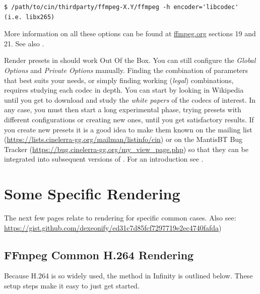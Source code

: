 \begin{lstlisting}[style=sh]
	$ /path/to/cin/thirdparty/ffmpeg-X.Y/ffmpeg -h encoder='libcodec' (i.e. libx265)
\end{lstlisting}

More information on all these options can be found at
\href{https://ffmpeg.org/ffmpeg-all.html#Format-Options}{ffmpeg.org}
sections 19 and 21. See also .

Render presets in \CGG{} should work Out Of the Box. You can still configure the \textit{Global Options} and \textit{Private Options} manually. Finding the combination of parameters that best suits your needs, or simply finding working (\textit{legal}) combinations, requires studying each codec in depth. You can start by looking in Wikipedia until you get to download and study the \textit{white papers} of the codecs of interest. In any case, you must then start a long experimental phase, trying presets with different configurations or creating new ones, until you get satisfactory results. If you create new presets it is a good idea to make them known on the mailing list ({\small \url{https://lists.cinelerra-gg.org/mailman/listinfo/cin}}) or on the MantisBT Bug Tracker ({\small \url{https://bug.cinelerra-gg.org/my_view_page.php}}) so that they can be integrated into subsequent versions of \CGG{}. For an introduction see .

\section{Some Specific Rendering}%
\label{sec:some_specific_rendering}

\noindent The next few pages relate to rendering for specific common
cases. Also see: \small\url{https://gist.github.com/dexeonify/ed31c7d85fcf7297719e2ec4740fafda})

\subsection{FFmpeg Common H.264 Rendering}%
\label{sub:ffmpeg_h264_rendering}

Because H.264 is so widely used, the method in \CGG{} Infinity is
outlined below.  These setup steps make it easy to just get started.

